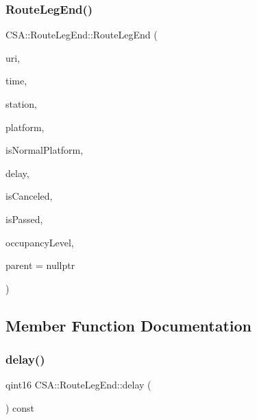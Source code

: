 \subsubsection{\texorpdfstring{Route\+Leg\+End()}{RouteLegEnd()}}
{\footnotesize\ttfamily C\+S\+A\+::\+Route\+Leg\+End\+::\+Route\+Leg\+End (\begin{DoxyParamCaption}\item[{const Q\+Url \&}]{uri,  }\item[{const Q\+Date\+Time \&}]{time,  }\item[{\mbox{\hyperlink{classCSA_1_1Station}{C\+S\+A\+::\+Station}} $\ast$}]{station,  }\item[{const Q\+String \&}]{platform,  }\item[{const bool \&}]{is\+Normal\+Platform,  }\item[{const qint16 \&}]{delay,  }\item[{const bool \&}]{is\+Canceled,  }\item[{const bool \&}]{is\+Passed,  }\item[{const \mbox{\hyperlink{classCSA_1_1Vehicle_a331cc81107e5f0a8f37f894729dd9bda}{C\+S\+A\+::\+Vehicle\+::\+Occupancy\+Level}} \&}]{occupancy\+Level,  }\item[{Q\+Object $\ast$}]{parent = {\ttfamily nullptr} }\end{DoxyParamCaption})\hspace{0.3cm}{\ttfamily [explicit]}}



\subsection{Member Function Documentation}
\mbox{\label{classCSA_1_1RouteLegEnd_ab1ea8c249d0a40884f446639ab030bc3}} 
\subsubsection{\texorpdfstring{delay()}{delay()}}
{\footnotesize\ttfamily qint16 C\+S\+A\+::\+Route\+Leg\+End\+::delay (\begin{DoxyParamCaption}{ }\end{DoxyParamCaption}) const}

\mbox{\label{classCSA_1_1RouteLegEnd_a68c581c134a26e25daf080d393b0ff76}} 
